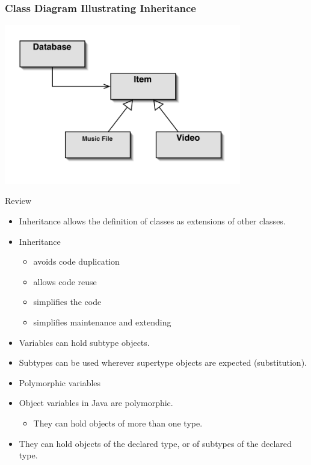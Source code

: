 \documentclass{beamer}
\begin{document}
\begin{frame}
\frametitle{Class Diagram Illustrating Inheritance}
\begin{center}
\includegraphics[height=7cm, keepaspectratio]{images/inheritance4}
\end{center}
\end{frame}

\begin{frame}
Review
\begin{itemize}
\item Inheritance allows the definition of classes as extensions of other classes.
\item Inheritance
\begin{itemize}
\item avoids code duplication
\item allows code reuse
\item simplifies the code
\item simplifies maintenance and extending
\end{itemize}
\item Variables can hold subtype objects.
\item Subtypes can be used wherever supertype objects are expected (substitution).
\end{itemize}
\end{frame}

\begin{frame}
\begin{itemize}
\item Polymorphic variables
\item Object variables in Java are polymorphic.
\begin{itemize}
\item They can hold objects of more than one type.
\end{itemize}
\item They can hold objects of the declared type, or of subtypes of the declared type.
\end{itemize}
\end{frame}
\end{document}
